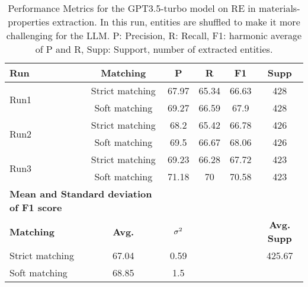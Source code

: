 \begin{table}[htbp]
    \small
    \centering
    \caption{Performance Metrics for the GPT3.5-turbo model on RE in materials-properties extraction. In this run, entities are shuffled to make it more challenging for the LLM. P: Precision, R: Recall, F1: harmonic average of P and R, Supp: Support, number of extracted entities.}
    \begin{tabular}{lccccc}
        \toprule
        \textbf{Run} & \textbf{Matching} & \textbf{P} & \textbf{R} & \textbf{F1} & \textbf{Supp} \\
        \midrule
        \multirow{2}{*}{Run1} & Strict matching & 67.97 & 65.34 & 66.63 & 428 \\
        & Soft matching & 69.27 & 66.59 & 67.9 & 428 \\
        \midrule
        \multirow{2}{*}{Run2} & Strict matching & 68.2 & 65.42 & 66.78 & 426 \\
        & Soft matching & 69.5 & 66.67 & 68.06 & 426 \\
        \midrule
        \multirow{2}{*}{Run3} & Strict matching & 69.23 & 66.28 & 67.72 & 423 \\
        & Soft matching & 71.18 & 70 & 70.58 & 423 \\
        \midrule
        \multicolumn{2}{l}{\textbf{Mean and Standard deviation of F1 score}} & & & & \\
        \midrule
        \textbf{Matching} & \textbf{Avg.} & $\sigma\textsuperscript{2}$ & & & \textbf{Avg. Supp}\\
        Strict matching & 67.04 & 0.59 & & & 425.67 \\
        Soft matching & 68.85 & 1.5 & & & \\
        \bottomrule
    \end{tabular}
\end{table}

